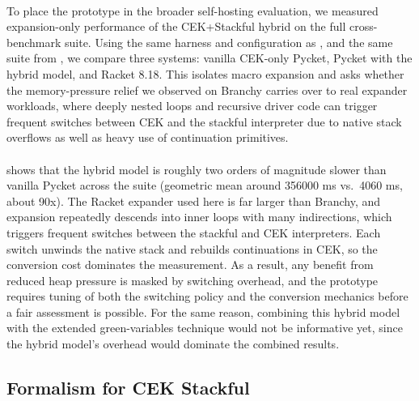       \paragraph{}%
        To place the prototype in the broader self-hosting evaluation, we measured expansion-only performance of the CEK+Stackful hybrid on the full cross-benchmark suite. Using the same harness and configuration as , and the same suite from , we compare three systems: vanilla CEK-only Pycket, Pycket with the hybrid model, and Racket 8.18. This isolates macro expansion and asks whether the memory-pressure relief we observed on Branchy carries over to real expander workloads, where deeply nested loops and recursive driver code can trigger frequent switches between CEK and the stackful interpreter due to native stack overflows as well as heavy use of continuation primitives.


      \paragraph{}%
         shows that the hybrid model is roughly two orders of magnitude slower than vanilla Pycket across the suite (geometric mean around 356000 ms vs.\ 4060 ms, about 90x). The Racket expander used here is far larger than Branchy, and expansion repeatedly descends into inner loops with many indirections, which triggers frequent switches between the stackful and CEK interpreters. Each switch unwinds the native stack and rebuilds continuations in CEK, so the conversion cost dominates the measurement. As a result, any benefit from reduced heap pressure is masked by switching overhead, and the prototype requires tuning of both the switching policy and the conversion mechanics before a fair assessment is possible. For the same reason, combining this hybrid model with the extended green-variables technique would not be informative yet, since the hybrid model's overhead would dominate the combined results.


    \subsection{Formalism for CEK \+ Stackful}


